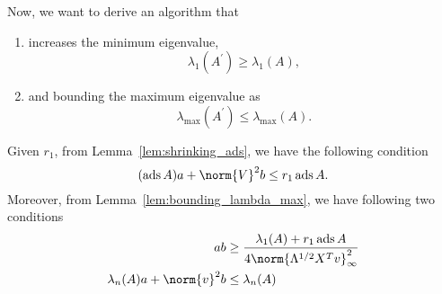 \documentclass[nobib]{my-handout}
\theoremstyle{definition}
\theoremstyle{remark}
\DeclareMathOperator{\ads}{ads}
\begin{document}
Now, we want to derive an algorithm that
\begin{enumerate}
	\item increases the minimum eigenvalue,
		\begin{equation*}
			\lambda_1 (A^\prime) \ge \lambda_1 (A),
		\end{equation*}
	\item and bounding the maximum eigenvalue as
		\begin{equation*}
			\lambda_{\max}(A^\prime) \le \lambda_{\max}(A).
		\end{equation*}
\end{enumerate}

Given $r_1$, from Lemma~\ref{lem:shrinking_ads}, we have the following
condition
\begin{equation}
	(\ads{A}) a + \norm{V}^2 b \le r_1 \ads{A}.
\end{equation}
Moreover, from Lemma~\ref{lem:bounding_lambda_max}, we have following two
conditions
\begin{equation}
	\begin{aligned}
		ab &\ge \frac{\lambda_1(A) + r_1 \ads{A}}{4 \norm{\Lambda^{1/2} X^T
		v}_{\infty}^2} \\
		\lambda_n(A) a + \norm{v}^2 b &\le \lambda_n(A)
	\end{aligned}
\end{equation}



\end{document}
